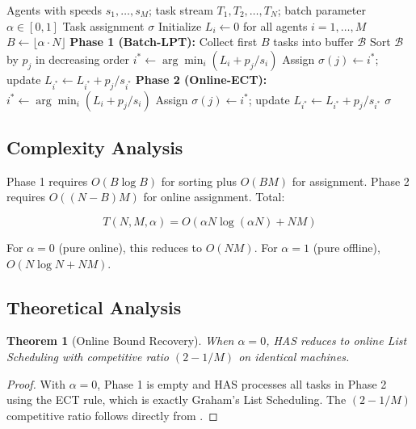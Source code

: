 \documentclass[conference]{IEEEtran}
\newtheorem{theorem}{Theorem}
\begin{document}
\begin{algorithm}[h]
\caption{Hybrid Adaptive Scheduler (HAS)}
\label{alg:has}
\begin{algorithmic}[1]
\REQUIRE Agents with speeds $s_1, \ldots, s_M$; task stream $T_1, T_2, \ldots, T_N$; batch parameter $\alpha \in [0,1]$
\ENSURE Task assignment $\sigma$
\STATE Initialize $L_i \leftarrow 0$ for all agents $i = 1, \ldots, M$
\STATE $B \leftarrow \lfloor \alpha \cdot N \rfloor$ 
\STATE \textbf{Phase 1 (Batch-LPT):}
\STATE Collect first $B$ tasks into buffer $\mathcal{B}$
\STATE Sort $\mathcal{B}$ by $p_j$ in decreasing order
    \STATE $i^* \leftarrow \arg\min_{i} \left( L_i + p_j / s_i \right)$
    \STATE Assign $\sigma(j) \leftarrow i^*$; update $L_{i^*} \leftarrow L_{i^*} + p_j / s_{i^*}$
\ENDFOR
\STATE \textbf{Phase 2 (Online-ECT):}
    \STATE $i^* \leftarrow \arg\min_{i} \left( L_i + p_j / s_i \right)$
    \STATE Assign $\sigma(j) \leftarrow i^*$; update $L_{i^*} \leftarrow L_{i^*} + p_j / s_{i^*}$
\ENDFOR
\RETURN $\sigma$
\end{algorithmic}
\end{algorithm}

\subsection{Complexity Analysis}

Phase 1 requires $O(B \log B)$ for sorting plus $O(BM)$ for assignment. Phase 2 requires $O((N-B)M)$ for online assignment. Total:

\begin{equation}
    T(N, M, \alpha) = O(\alpha N \log(\alpha N) + NM)
\end{equation}

For $\alpha = 0$ (pure online), this reduces to $O(NM)$. For $\alpha = 1$ (pure offline), $O(N \log N + NM)$.

\subsection{Theoretical Analysis}

\begin{theorem}[Online Bound Recovery]
When $\alpha = 0$, HAS reduces to online List Scheduling with competitive ratio $(2 - 1/M)$ on identical machines.
\end{theorem}

\begin{proof}
With $\alpha = 0$, Phase 1 is empty and HAS processes all tasks in Phase 2 using the ECT rule, which is exactly Graham's List Scheduling. The $(2-1/M)$ competitive ratio follows directly from \cite{graham1966}.
\end{proof}
\end{document}
